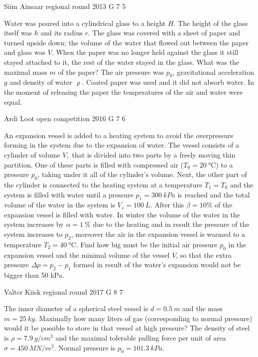 \documentclass[11pt]{article}
\begin{document}
{Siim Ainsaar} %
{regional round} %
{2013} %
{G 7} %
{5} %
{

\ifEngStatement
Water was poured into a cylindrical glass to a height $H$. The height of the glass itself was $h$ and its radius $r$. The glass was covered with a sheet of paper and turned upside down; the volume of the water that flowed out between the paper and glass was $V$. When the paper was no longer held against the glass it still stayed attached to it, the rest of the water stayed in the glass. What was the maximal mass $m$ of the paper? The air pressure was $p_0$, gravitational acceleration $g$ and density of water $\varrho$. Coated paper was used and it did not absorb water. In the moment of releasing the paper the temperatures of the air and water were equal.
\fi
}

{Ardi Loot} %
{open competition} %
{2016} %
{G 7} %
{6} %
{

\ifEngStatement
An expansion vessel is added to a heating system to avoid the overpressure forming in the system due to the expansion of water. The vessel consists of a cylinder of volume $V,$ that is divided into two parts by a freely moving thin partition. One of these parts is filled with compressed air ($T_{0}=\SI{20}{\celsius}$) to a pressure $p_{0}$, taking under it all of the cylinder’s volume. Next, the other part of the cylinder is connected to the heating system at a temperature $T_{1}=T_{0}$ and the system is filled with water until a pressure $p_{1}=\SI{300}{kPa}$ is reached and the total volume of the water in the system is $V_{s}=\SI{100}{L}$. After this $\beta=10\%$ of the expansion vessel is filled with water. In winter the volume of the water in the system increases by $\alpha=\SI{1}{\%}$ due to the heating and in result the pressure of the system increases to $p_{2}$, moreover the air in the expansion vessel is warmed to a temperature $T_{2}=\SI{40}{\celsius}$. Find how big must be the initial air pressure $p_{0}$ in the expansion vessel and the minimal volume of the vessel $V$, so that the extra pressure $\Delta p=p_{2}-p_{1}$ formed in result of the water’s expansion would not be bigger than 50 kPa.
\fi
}

{Valter Kiisk} %
{regional round} %
{2017} %
{G 8} %
{7} %
{

\ifEngStatement
The inner diameter of a spherical steel vessel is $d=\SI{0.5}{m}$ and the mass $m=\SI{25}{kg}$. Maximally how many liters of gas (corresponding to normal pressure) would it be possible to store in that vessel at high pressure? The density of steel is $\rho=\SI{7.9}{g/cm^3}$ and the maximal tolerable pulling force per unit of area $\sigma=\SI{450}{MN/m^2}$. Normal pressure is $p_0=\SI{101.3}{kPa}$.
\fi
}
\end{document}
